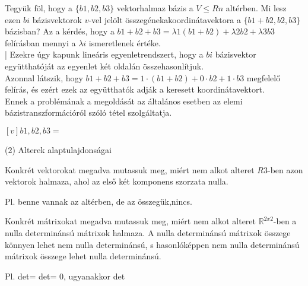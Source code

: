 \begin{frame}
  \begin{tcolorbox}[title={1/4. -Q-}]
      Tegyük föl, hogy a $\{b1,b2,b3\}$ vektorhalmaz bázis a $V ≤ Rn$ altérben. Mi lesz ezen $bi$ bázisvektorok $v$-vel jelölt összegénekakoordinátavektora a $\{b1+b2,b2,b3\}$ bázisban?
  \tcblower
    Az a kérdés, hogy a $b1+b2+b3 = λ1(b1+b2)+λ2b2+λ3b3$ felírásban mennyi a $λi$ ismeretlenek értéke.\\|
      Ezekre úgy kapunk lineáris egyenletrendszert, hogy a $bi$ bázisvektor együtthatóját az egyenlet két oldalán összehasonlítjuk.\\
      
      Azonnal látszik, hogy $b1 + b2 + b3 = 1·(b1 + b2) + 0·b2 + 1·b3$ megfelelő felírás, és ezért ezek az együtthatók adják a keresett koordinátavektort.\\
      
      Ennek a problémának a megoldását az általános esetben az elemi bázistranszformációról szóló tétel szolgáltatja.
      
   $[v]b1,b2,b3 =$ 
  \end{tcolorbox}
\end{frame}  

\begin{frame}[plain]
\begin{tcolorbox}[center, colback={myyellow}, coltext={black}, colframe={myyellow}]
    {\RHuge  (2) Alterek alaptulajdonságai}
    \mmedskip
\end{tcolorbox}
\end{frame}

\begin{frame}
  \begin{tcolorbox}[title={2/1. -R-}]
      Konkrét vektorokat megadva mutassuk meg, miért nem alkot alteret $R3$-ben azon vektorok halmaza, ahol az első két komponens szorzata nulla. 
  \tcblower

    \mmedskip 
  
   Pl. benne vannak az altérben, de az összegük,nincs.
  \end{tcolorbox}
\end{frame}


\begin{frame}
  \begin{tcolorbox}[title={2/2. -Q-}]
      Konkrét mátrixokat megadva mutassuk meg, miért nem alkot alteret $\mathbb{R}^{2 x 2}$-ben a nulla determinánsú mátrixok halmaza. 
  \tcblower
    A nulla determinánsú mátrixok összege könnyen lehet nem nulla determinánsú, s hasonlóképpen nem nulla determinánsú mátrixok összege lehet nulla determinánsú.\\
    \mmedskip 
  
    Pl. det= det= 0, ugyanakkor det
  \end{tcolorbox}
\end{frame}

